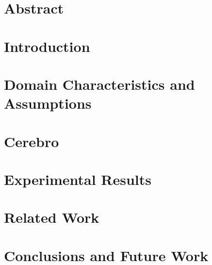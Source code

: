 \section{Abstract}


\section{Introduction}
\label{sec:cerbro_intro}


\section{Domain Characteristics and Assumptions}
\label{sec:cerebro_approach}



\section{Cerebro}
\label{sec:cerebro_design}


\section{Experimental Results}
\label{sec:cerebro_results}


\section{Related Work}
\label{sec:cerebro_related_work}


\section{Conclusions and Future Work}
\label{sec:cerebro_conclusions}

